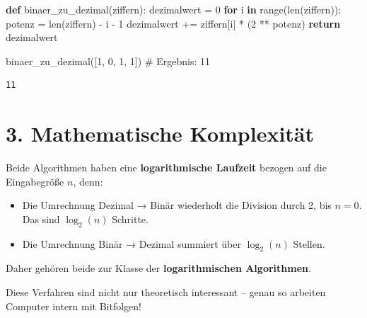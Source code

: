 \documentclass[
  letterpaper,
  DIV=11,
  numbers=noendperiod]{scrreprt}
\newenvironment{Shaded}{\begin{snugshade}}{\end{snugshade}}
\newcommand{\BuiltInTok}[1]{\textcolor[rgb]{0.00,0.23,0.31}{#1}}
\newcommand{\CommentTok}[1]{\textcolor[rgb]{0.37,0.37,0.37}{#1}}
\newcommand{\ControlFlowTok}[1]{\textcolor[rgb]{0.00,0.23,0.31}{\textbf{#1}}}
\newcommand{\DecValTok}[1]{\textcolor[rgb]{0.68,0.00,0.00}{#1}}
\newcommand{\KeywordTok}[1]{\textcolor[rgb]{0.00,0.23,0.31}{\textbf{#1}}}
\newcommand{\NormalTok}[1]{\textcolor[rgb]{0.00,0.23,0.31}{#1}}
\newcommand{\OperatorTok}[1]{\textcolor[rgb]{0.37,0.37,0.37}{#1}}
\providecommand{\tightlist}{%
  \setlength{\itemsep}{0pt}\setlength{\parskip}{0pt}}\usepackage{longtable,booktabs,array}
\begin{document}
\begin{Shaded}
\begin{Highlighting}[]
\KeywordTok{def}\NormalTok{ binaer\_zu\_dezimal(ziffern):}
\NormalTok{    dezimalwert }\OperatorTok{=} \DecValTok{0}
    \ControlFlowTok{for}\NormalTok{ i }\KeywordTok{in} \BuiltInTok{range}\NormalTok{(}\BuiltInTok{len}\NormalTok{(ziffern)):}
\NormalTok{        potenz }\OperatorTok{=} \BuiltInTok{len}\NormalTok{(ziffern) }\OperatorTok{{-}}\NormalTok{ i }\OperatorTok{{-}} \DecValTok{1}
\NormalTok{        dezimalwert }\OperatorTok{+=}\NormalTok{ ziffern[i] }\OperatorTok{*}\NormalTok{ (}\DecValTok{2} \OperatorTok{**}\NormalTok{ potenz)}
    \ControlFlowTok{return}\NormalTok{ dezimalwert}

\NormalTok{binaer\_zu\_dezimal([}\DecValTok{1}\NormalTok{, }\DecValTok{0}\NormalTok{, }\DecValTok{1}\NormalTok{, }\DecValTok{1}\NormalTok{])  }\CommentTok{\# Ergebnis: 11}
\end{Highlighting}
\end{Shaded}

\begin{verbatim}
11
\end{verbatim}

\section{3. Mathematische
Komplexität}\label{mathematische-komplexituxe4t}

Beide Algorithmen haben eine \textbf{logarithmische Laufzeit} bezogen
auf die Eingabegröße \(n\), denn:

\begin{itemize}
\tightlist
\item
  Die Umrechnung Dezimal → Binär wiederholt die Division durch 2, bis
  \(n = 0\). Das sind \(\log_2(n)\) Schritte.
\item
  Die Umrechnung Binär → Dezimal summiert über \(\log_2(n)\) Stellen.
\end{itemize}

Daher gehören beide zur Klasse der \textbf{logarithmischen Algorithmen}.

\begin{tcolorbox}[enhanced jigsaw, left=2mm, leftrule=.75mm, bottomrule=.15mm, title=\textcolor{quarto-callout-note-color}{\faInfo}\hspace{0.5em}{Hinweis}, colback=white, arc=.35mm, breakable, titlerule=0mm, bottomtitle=1mm, colbacktitle=quarto-callout-note-color!10!white, toprule=.15mm, opacityback=0, coltitle=black, rightrule=.15mm, opacitybacktitle=0.6, toptitle=1mm, colframe=quarto-callout-note-color-frame]

Diese Verfahren sind nicht nur theoretisch interessant -- genau so
arbeiten Computer intern mit Bitfolgen!

\end{tcolorbox}
\end{document}
